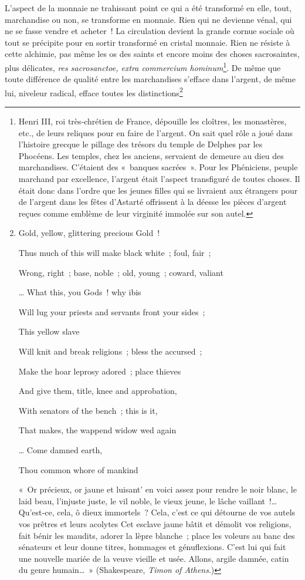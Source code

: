 \documentclass[french,twoside]{book} %
\begin{document}
L’aspect de la monnaie ne trahissant point ce qui a été transformé en elle, tout, marchandise ou non, se transforme en monnaie. Rien qui ne devienne vénal, qui ne se fasse vendre et acheter ! La circulation devient la grande cornue sociale où tout se précipite pour en sortir transformé en cristal monnaie. Rien ne résiste à cette alchimie, pas même les os des saints et encore moins des choses sacrosaintes, plus délicates, \emph{res sacrosanctoe, extra commercium hominum}\footnote{Henri III, roi très‑chrétien de France, dépouille les cloîtres, les monastères, etc., de leurs reliques pour en faire de l’argent. On sait quel rôle a joué dans l’histoire grecque le pillage des trésors du temple de Delphes par les Phocéens. Les temples, chez les anciens, servaient de demeure au dieu des marchandises. C’étaient des « banques sacrées ». Pour les Phéniciens, peuple marchand par excellence, l’argent était l’aspect transfiguré de toutes choses. Il était donc dans l’ordre que les jeunes filles qui se livraient aux étrangers pour de l’argent dans les fêtes d’Astarté offrissent à la déesse les pièces d’argent reçues comme emblème de leur virginité immolée sur son autel.}. De même que toute différence de qualité entre les marchandises s’efface dans l’argent, de même lui, niveleur radical, efface toutes les distinctions\footnote{ \noindent Gold, yellow, glittering precious Gold !\par
 Thus much of this will make black white ; foul, fair ;\par
 Wrong, right ; base, noble ; old, young ; coward, valiant\par
 … What this, you Gods ! why ibis\par
 Will lug your priests and servants front your sides ;\par
 This yellow slave\par
 Will knit and break religions ; bless the accursed ;\par
 Make the hoar leprosy adored ; place thieves\par
 And give them, title, knee and approbation,\par
 With senators of the bench ; this is it,\par
 That makes, the wappend widow wed again\par
 … Come damned earth,\par
 Thou common whore of mankind\par
 « Or précieux, or jaune et luisant’ en voici assez pour rendre le noir blanc, le laid beau, l’injuste juste, le vil noble, le vieux jeune, le lâche vaillant !… Qu’est‑ce, cela, ô dieux immortels ? Cela, c’est ce qui détourne de vos autels vos prêtres et leurs acolytes Cet esclave jaune bâtit et démolit vos religions, fait bénir les maudits, adorer la lèpre blanche ; place les voleurs au banc des sénateurs et leur donne titres, hommages et génuflexions. C’est lui qui fait une nouvelle mariée de la veuve vieille et usée. Allons, argile damnée, catin du genre humain… » (Shakespeare, \emph{Timon of Athens}.)
}
\end{document}
